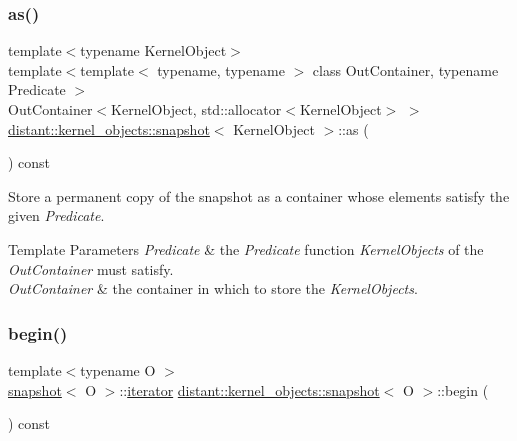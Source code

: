 \subsubsection{\texorpdfstring{as()}{as()}}
{\footnotesize\ttfamily template$<$typename Kernel\+Object$>$ \\
template$<$template$<$ typename, typename $>$ class Out\+Container, typename Predicate $>$ \\
Out\+Container$<$Kernel\+Object, std\+::allocator$<$Kernel\+Object$>$ $>$ \mbox{\hyperlink{classdistant_1_1kernel__objects_1_1snapshot}{distant\+::kernel\+\_\+objects\+::snapshot}}$<$ Kernel\+Object $>$\+::as (\begin{DoxyParamCaption}\item[{Predicate}]{ }\end{DoxyParamCaption}) const}



Store a permanent copy of the snapshot as a container whose elements satisfy the given {\itshape Predicate}. 


\begin{DoxyTemplParams}{Template Parameters}
{\em Predicate} & the {\itshape Predicate} function {\itshape Kernel\+Objects} of the {\itshape Out\+Container} must satisfy. \\
\hline
{\em Out\+Container} & the container in which to store the {\itshape Kernel\+Objects}. \\
\hline
\end{DoxyTemplParams}
\mbox{\label{classdistant_1_1kernel__objects_1_1snapshot_a5e9c95fe747a3f4d28dc3d352874770e}} 
\subsubsection{\texorpdfstring{begin()}{begin()}\hspace{0.1cm}{\footnotesize\ttfamily [1/2]}}
{\footnotesize\ttfamily template$<$typename O $>$ \\
\mbox{\hyperlink{classdistant_1_1kernel__objects_1_1snapshot}{snapshot}}$<$ O $>$\+::\mbox{\hyperlink{classdistant_1_1kernel__objects_1_1snapshot__iterator}{iterator}} \mbox{\hyperlink{classdistant_1_1kernel__objects_1_1snapshot}{distant\+::kernel\+\_\+objects\+::snapshot}}$<$ O $>$\+::begin (\begin{DoxyParamCaption}{ }\end{DoxyParamCaption}) const}



